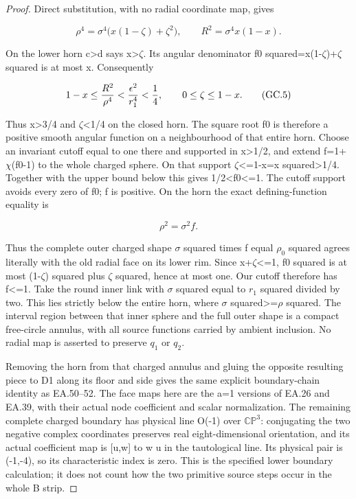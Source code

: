 \begin{proof}
Direct substitution, with no radial coordinate map, gives

\[
 \rho^4=\sigma^4\bigl(x(1-\zeta)+\zeta^2\bigr),
 \qquad R^2=\sigma^4 x(1-x).                       \tag{GC.4}
\]

On the lower horn c\textgreater d says x\textgreater{}\(\zeta\). Its angular denominator
f0 squared=x(1-\(\zeta\))+\(\zeta\) squared is at most x. Consequently

\[
 1-x\le {R^2\over\rho^4}
       <{\epsilon^2\over r_1^4}<\frac14,
 \qquad 0\le\zeta\le1-x.                          \tag{GC.5}
\]

Thus x\textgreater3/4 and \(\zeta\)\textless1/4 on the closed horn. The square root f0 is therefore a positive
smooth angular function on a neighbourhood of that entire horn.
Choose an invariant cutoff equal to one there and supported in
x\textgreater1/2, and extend f=1+\(\chi\)(f0-1) to the whole charged sphere.
On that support \(\zeta\)\textless=1-x=x squared\textgreater1/4.
Together with the upper bound below this gives 1/2\textless f0\textless=1.
The cutoff support avoids every zero of f0; f is positive.
On the horn the exact defining-function equality is

\[
                         \rho^2=\sigma^2 f.         \tag{GC.6}
\]

Thus the complete outer charged shape \(\sigma\) squared times f
equal \(\rho_0\) squared agrees literally with the old radial face
on its lower rim. Since x+\(\zeta\)\textless=1, f0 squared is at most
(1-\(\zeta\)) squared plus \(\zeta\) squared, hence at most one. Our
cutoff therefore has f\textless=1. Take the round inner link with
\(\sigma\) squared equal to \(r_1\) squared divided by two. This lies
strictly below the entire horn, where \(\sigma\) squared\textgreater=\(\rho\) squared.
The interval region between that inner sphere and the full
outer shape is a compact free-circle annulus, with all source
functions carried by ambient inclusion. No radial map is
asserted to preserve \(q_1\) or \(q_2\).

Removing the horn from that charged annulus and gluing the
opposite resulting piece to D1 along its floor and side gives
the same explicit boundary-chain identity as EA.50--52. The
face maps here are the a=1 versions of EA.26 and EA.39, with
their actual node coefficient and scalar normalization. The
remaining complete charged boundary has physical line O(-1)
over \(\mathbb{CP}^3\): conjugating the two negative complex coordinates
preserves real eight-dimensional orientation, and its actual
coefficient map is {[}u,w{]} to w u in the tautological line.
Its physical pair is (-1,-4), so its characteristic index is
zero. This is the specified lower boundary calculation; it
does not count how the two primitive source steps occur in
the whole B strip.


\end{proof}
